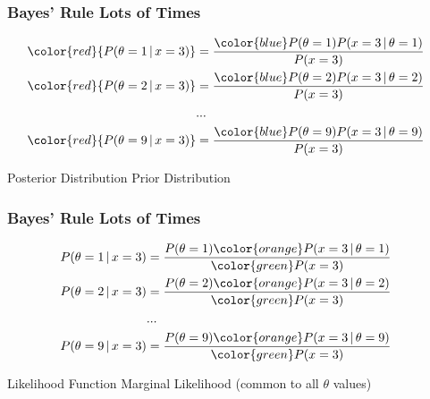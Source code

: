 \documentclass{beamer}
\newcommand{\given}{\,|\,}
\begin{document}
\begin{frame}
\frametitle{Bayes' Rule Lots of Times}
\begin{align}
\color{red}{P(\theta = 1 \given x = 3)} &= \frac{{\color{blue}P(\theta=1)}P(x=3 \given \theta=1)}{P(x=3)}\\
\color{red}{P(\theta = 2 \given x = 3)} &= \frac{{\color{blue}P(\theta=2)}P(x=3 \given \theta=2)}{P(x=3)}\\
&...&\\
\color{red}{P(\theta = 9 \given x = 3)} &= \frac{{\color{blue}P(\theta=9)}P(x=3 \given \theta=9)}{P(x=3)}\\
\end{align}

{\color{red}Posterior Distribution}
{\color{blue}Prior Distribution}

\end{frame}


\begin{frame}
\frametitle{Bayes' Rule Lots of Times}
\begin{align}
P(\theta = 1 \given x = 3) &= \frac{P(\theta=1){\color{orange}P(x=3 \given \theta=1)}}{\color{green}P(x=3)}\\
P(\theta = 2 \given x = 3) &= \frac{P(\theta=2){\color{orange}P(x=3 \given \theta=2)}}{\color{green}P(x=3)}\\
&...&\\
P(\theta = 9 \given x = 3) &= \frac{P(\theta=9){\color{orange}P(x=3 \given \theta=9)}}{\color{green}P(x=3)}\\
\end{align}

{\color{orange}Likelihood Function}
{\color{green}Marginal Likelihood (common to all $\theta$ values)}

\end{frame}
\end{document}

